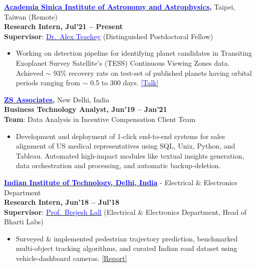 \documentclass[11pt]{res} %
\begin{document}
\begin{resume}
{\bf \href{https://events.asiaa.sinica.edu.tw/ssp/2021/}{\textcolor{blue}{Academia Sinica Institute of Astronomy and Astrophysics}},} Taipei, Taiwan (Remote)\\
\textbf{Research Intern, Jul'21 -- Present}\\
\textbf{Supervisor}: \href{https://alexteachey.wordpress.com/}{\textcolor{blue}{Dr.~Alex Teachey}} (Distinguished Postdoctoral Fellow)
\vspace{0.1cm}
\begin{itemize}
 \item Working on detection pipeline for identifying planet candidates in Transiting Exoplanet Survey Satellite's (TESS) Continuous Viewing Zones data. Achieved $\sim$ 93\% recovery rate on  test-set of published planets having orbital periods ranging from $\sim$ 0.5 to 300 days. \hfill \href{https://youtu.be/sT8yIwQLXuc}{\textcolor{blue}{[Talk]}}
 
\end{itemize}

\vspace{-0.1cm}
{\bf \href{https://www.zs.com/}{\textcolor{blue}{ZS Associates}},} New Delhi, India\\
\textbf{Business Technology Analyst, Jun'19 -- Jan'21}\\
\textbf{Team}: Data Analysis in Incentive Compensation Client Team
\vspace{0.1cm}
\begin{itemize}
    \item Development and deployment of 1-click end-to-end systems for sales alignment of US medical representatives using SQL, Unix, Python, and Tableau. Automated high-impact modules like textual insights generation, data orchestration and processing, and automatic backup-deletion.
\end{itemize}

\vspace{-0.1cm}
{\bf \href{https://home.iitd.ac.in/}{\textcolor{blue}{Indian Institute of Technology, Delhi, India}}} - Electrical \& Electronics Department\\
\textbf{Research Intern, Jun'18 – Jul'18}\\
\textbf{Supervisor}: \href{https://web.iitd.ac.in/~brejesh/index.html}{\textcolor{blue}{Prof.~Brejesh Lall}} (Electrical \& Electronics Department, Head of Bharti Labs)
\vspace{0.1cm}
\begin{itemize}
    \item Surveyed \& implemented pedestrian trajectory prediction, benchmarked multi-object tracking algorithms, and curated Indian road dataset using vehicle-dashboard cameras. \hfill \textcolor{blue}{\href{https://drive.google.com/file/d/1VzW1S9UInuxXegAi2ursUIjQHOWDsS6R/view?usp=sharing}{[Report]}}
\end{itemize} 


\end{resume}
\end{document}
